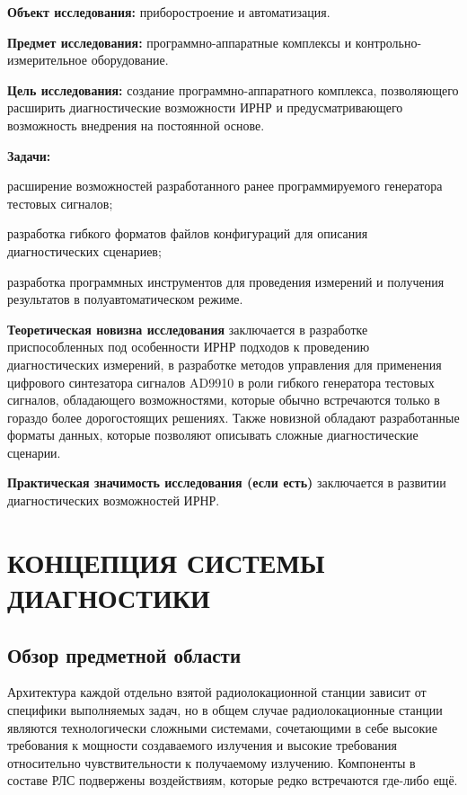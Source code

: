 \documentclass{report}
\begin{document}
{\bf Объект исследования:} приборостроение и автоматизация.

{\bf Предмет исследования:} программно-аппаратные комплексы и контрольно-измерительное оборудование.

{\bf Цель исследования:} создание программно-аппаратного комплекса, позволяющего расширить диагностические возможности ИРНР и предусматривающего возможность внедрения на постоянной основе.

{\bf Задачи:}
\begin{enumarabic}
\item расширение возможностей разработанного ранее программируемого генератора тестовых сигналов;
\item разработка гибкого форматов файлов конфигураций для описания диагностических сценариев;
\item разработка программных инструментов для проведения измерений и получения результатов в полуавтоматическом режиме.
\end{enumarabic}


{\bf Теоретическая новизна исследования} заключается в разработке приспособленных под особенности ИРНР подходов к проведению диагностических измерений, в разработке методов управления для применения цифрового синтезатора сигналов AD9910 в роли гибкого генератора тестовых сигналов, обладающего возможностями, которые обычно встречаются только в гораздо более дорогостоящих решениях. Также новизной обладают разработанные форматы данных, которые позволяют описывать сложные диагностические сценарии.

{\bf Практическая значимость исследования (если есть)} заключается в развитии диагностических возможностей ИРНР.

% 
\setcounter{section}{0} %
\setcounter{subsection}{0} %
\setcounter{equation}{0} %

\chapter{КОНЦЕПЦИЯ СИСТЕМЫ ДИАГНОСТИКИ}

\section{Обзор предметной области}

Архитектура каждой отдельно взятой радиолокационной станции зависит от специфики выполняемых задач, но в общем случае радиолокационные станции являются технологически сложными системами, сочетающими в себе высокие требования к мощности создаваемого излучения и высокие требования относительно чувствительности к получаемому излучению. Компоненты в составе РЛС подвержены воздействиям, которые редко встречаются где-либо ещё.
\end{document}
